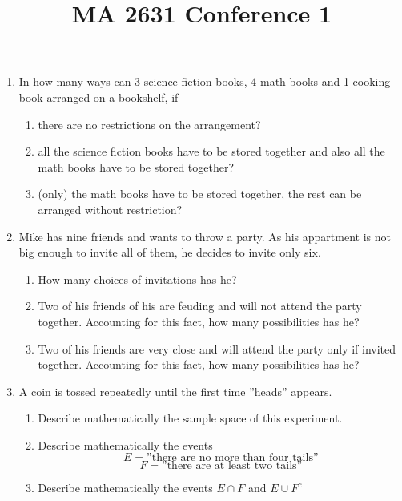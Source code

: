 \documentclass{article}
\title{MA 2631 Conference 1}
\begin{document}
\maketitle

\begin{enumerate}

\item

In how many ways can 3 science fiction books, 4 math books and 1 cooking book
arranged on a bookshelf, if

\begin{enumerate}
\item there are no restrictions on the arrangement?
\item all the science fiction books have to be stored together and also all the math books
have to be stored together?
\item (only) the math books have to be stored together, the rest can be arranged without
restriction?
\end{enumerate}


\item 

Mike has nine friends and wants to throw a party. As his appartment is not big enough
to invite all of them, he decides to invite only six.

\begin{enumerate}
\item How many choices of invitations has he?
\item Two of his friends of his are feuding and will not attend the party together.
Accounting for this fact, how many possibilities has he?
\item Two of his friends are very close and will attend the party only if invited together.
Accounting for this fact, how many possibilities has he?
\end{enumerate}


\item

A coin is tossed repeatedly until the first time ”heads” appears.

\begin{enumerate}
\item Describe mathematically the sample space of this experiment.
\item Describe mathematically the events
$$E = \text{”there are no more than four tails”}$$ 
$$F = \text{”there are at least two tails”}$$
\item Describe mathematically the events $E\cap F$ and $E \cup F^c$
\end{enumerate}



\end{enumerate}
\end{document}
